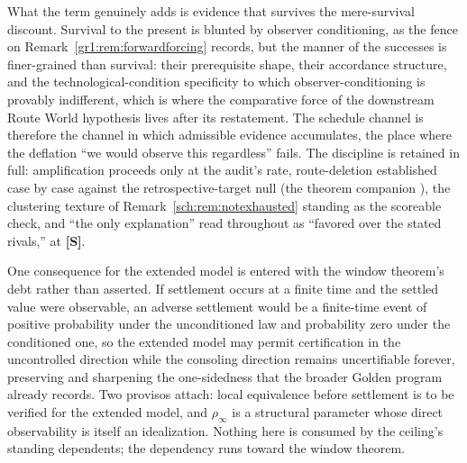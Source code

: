 \begin{remark}
What the term genuinely adds is evidence that survives the
mere-survival discount. Survival to the present is blunted by
observer conditioning, as the fence on
Remark~\ref{gr1:rem:forwardforcing} records, but the manner of the
successes is finer-grained than survival: their prerequisite shape,
their accordance structure, and the technological-condition
specificity to which observer-conditioning is provably indifferent,
which is where the comparative force of
the downstream Route World hypothesis lives after its restatement. The
schedule channel is therefore the channel in which admissible
evidence accumulates, the place where the deflation ``we would
observe this regardless'' fails. The discipline is retained in full:
amplification proceeds only at the audit's rate, route-deletion
established case by case against the retrospective-target null
(the theorem companion \cite{GoldenTargeted}), the clustering texture of
Remark~\ref{sch:rem:notexhausted} standing as the scoreable check,
and ``the only explanation'' read throughout as ``favored over the
stated rivals,'' at \textbf{[S]}.

One consequence for the extended model is entered with the window
theorem's debt rather than asserted. If settlement occurs at a
finite time and the settled value were observable, an adverse
settlement would be a finite-time event of positive probability
under the unconditioned law and probability zero under the
conditioned one, so the extended model may permit certification in
the uncontrolled direction while the consoling direction remains
uncertifiable forever, preserving and sharpening the one-sidedness
that the broader Golden program already records. Two provisos
attach: local equivalence before settlement is to be verified for
the extended model, and $\rho_\infty$ is a structural parameter
whose direct observability is itself an idealization. Nothing here
is consumed by the ceiling's standing dependents; the dependency
runs toward the window theorem.
\end{remark}

